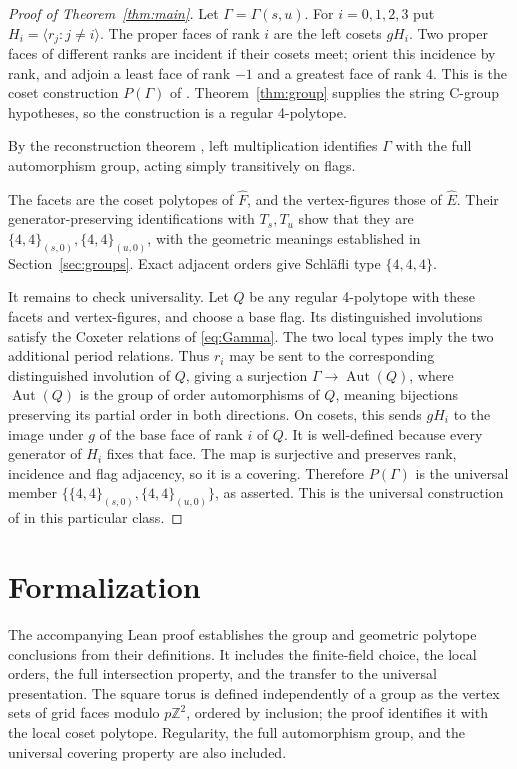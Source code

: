 \documentclass[11pt]{article}
\theoremstyle{definition}
\newcommand{\Z}{\mathbb Z}
\newcommand{\Aut}{\operatorname{Aut}}
\newcommand{\ang}[1]{\langle #1\rangle}
\newcommand{\tor}[1]{\{4,4\}_{(#1,0)}}
\begin{document}
\begin{proof}[Proof of Theorem~\ref{thm:main}]
Let $\Gamma=\Gamma(s,u)$. For $i=0,1,2,3$ put
$H_i=\ang{r_j:j\ne i}$. The proper faces of rank $i$ are the left
cosets $gH_i$. Two proper faces of different ranks are incident if their
cosets meet; orient this incidence by rank, and adjoin a least face of
rank $-1$ and a greatest face of rank 4. This is the coset construction
$P(\Gamma)$ of \cite[Section 2E]{ARP}. Theorem~\ref{thm:group} supplies the string C-group
hypotheses, so the construction is a regular 4-polytope.

By the reconstruction theorem \cite[Theorem 2E11]{ARP}, left multiplication
identifies $\Gamma$ with the full automorphism group, acting simply
transitively on flags.

The facets are the coset polytopes of $\widehat F$, and the
vertex-figures those of $\widehat E$.
Their generator-preserving identifications with $T_s,T_u$ show that
they are $\tor{s},\tor{u}$, with the geometric meanings established in
Section~\ref{sec:groups}. Exact adjacent orders give Schläfli type
$\{4,4,4\}$.

It remains to check universality. Let $Q$ be any regular 4-polytope
with these facets and vertex-figures, and choose a base flag.
Its distinguished involutions satisfy the Coxeter relations of
\eqref{eq:Gamma}. The two local types imply the two
additional period relations. Thus $r_i$ may be sent to the corresponding
distinguished involution of $Q$, giving a surjection
$\Gamma\to\Aut(Q)$, where $\Aut(Q)$ is the group of
order automorphisms of $Q$, meaning bijections preserving its partial order
in both directions. On cosets, this sends $gH_i$ to the image under
$g$ of the base face of rank $i$ of $Q$.
It is well-defined because every generator of $H_i$ fixes that face.
The map is surjective and preserves rank, incidence and flag adjacency,
so it is a covering. Therefore $P(\Gamma)$ is the universal member
$\{\tor{s},\tor{u}\}$, as asserted. This is the universal construction
of \cite[Theorem 4A2]{ARP} in this particular class.
\end{proof}

\section{Formalization}\label{sec:lean}
The accompanying Lean proof establishes the group and geometric polytope
conclusions from their definitions. It includes the finite-field choice,
the local orders, the full intersection property, and the transfer to the
universal presentation. The square torus is defined independently of a
group as the vertex sets of grid faces modulo $p\Z^2$, ordered by inclusion;
the proof identifies it with the local coset polytope. Regularity, the
full automorphism group, and the universal covering property are also
included.
\end{document}
